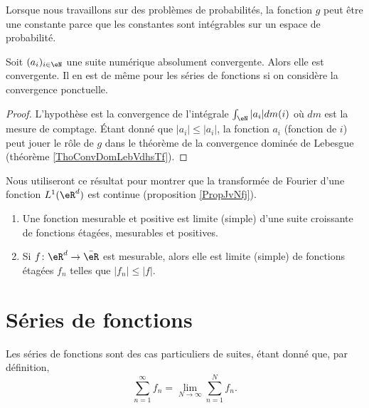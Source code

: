 \begin{remark}
    Lorsque nous travaillons sur des problèmes de probabilités, la fonction \( g\) peut être une constante parce que les constantes sont intégrables sur un espace de probabilité.
\end{remark}

\begin{corollary}       \label{CorCvAbsNormwEZdRc}
    Soit \( (a_i)_{i\in \eN}\) une suite numérique absolument convergente. Alors elle est convergente. Il en est de même pour les séries de fonctions si on considère la convergence ponctuelle.
\end{corollary}

\begin{proof}
    L'hypothèse est la convergence de l'intégrale \( \int_{\eN}| a_i |dm(i)\) où \( dm\) est la mesure de comptage. Étant donné que \( | a_i |\leq | a_i |\), la fonction \( a_i\) (fonction de \( i\)) peut jouer le rôle de \( g\) dans le théorème de la convergence dominée de Lebesgue (théorème \ref{ThoConvDomLebVdhsTf}).
\end{proof}
Nous utiliseront ce résultat pour montrer que la transformée de Fourier d'une fonction \( L^1(\eR^d)\) est continue (proposition \ref{PropJvNfj}).

\begin{proposition} \label{PropUXjnwLf}
    \begin{enumerate}
        \item
            Une fonction mesurable et positive est limite (simple) d'une suite croissante de fonctions étagées, mesurables et positives.
        \item
            Si \( f\colon \eR^d\to \bar \eR\) est mesurable, alors elle est limite (simple) de fonctions étagées \( f_n\) telles que \( | f_n |\leq | f |\).
    \end{enumerate}
\end{proposition}

\section{Séries de fonctions}

Les séries de fonctions sont des cas particuliers de suites, étant donné que, par définition,
\begin{equation}
    \sum_{n=1}^{\infty}f_n=\lim_{N\to \infty} \sum_{n=1}^{N}f_n.
\end{equation}

